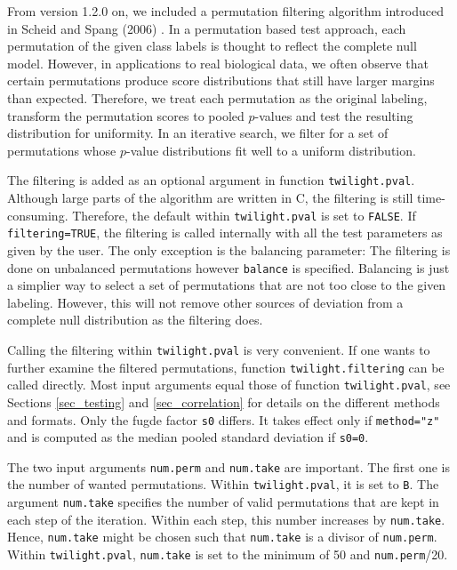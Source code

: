 \documentclass[11pt,a4paper,fleqn]{report}
\newcommand{\Rfunction}[1]{{\texttt{#1}}}
\newcommand{\Rfunarg}[1]{{\texttt{#1}}}
\begin{document}
From version 1.2.0 on, we included a permutation filtering algorithm introduced in Scheid and Spang (2006) \cite{scheid06}. In a permutation based test approach, each permutation of the given class labels is thought to reflect the complete null model. However, in applications to real biological data, we often observe that certain permutations produce score distributions that still have larger margins than expected. Therefore, we treat each permutation as the original labeling, transform the permutation scores to pooled $p$-values and test the resulting distribution for uniformity. In an iterative search, we filter for a set of permutations whose $p$-value distributions fit well to a uniform distribution.

The filtering is added as an optional argument in function \Rfunction{twilight.pval}. Although large parts of the algorithm are written in C, the filtering is still time-consuming. Therefore, the default within \Rfunction{twilight.pval} is set to \Rfunarg{FALSE}. If \Rfunarg{filtering=TRUE}, the filtering is called internally with all the test parameters as given by the user. The only exception is the balancing parameter: The filtering is done on unbalanced permutations however \Rfunarg{balance} is specified. Balancing is just a simplier way to select a set of permutations that are not too close to the given labeling. However, this will not remove other sources of deviation from a complete null distribution as the filtering does.

Calling the filtering within \Rfunction{twilight.pval} is very convenient. If one wants to further examine the filtered permutations, function \Rfunarg{twilight.filtering} can be called directly. Most input arguments equal those of function \Rfunarg{twilight.pval}, see Sections \ref{sec_testing} and \ref{sec_correlation} for details on the different methods and formats. Only the fugde factor \Rfunarg{s0} differs. It takes effect only if \Rfunarg{method="z"} and is computed as the median pooled standard deviation if \Rfunarg{s0=0}.

The two input arguments \Rfunarg{num.perm} and \Rfunarg{num.take} are important. The first one is the number of wanted permutations. Within \Rfunction{twilight.pval}, it is set to \Rfunarg{B}. The argument \Rfunarg{num.take} specifies the number of valid permutations that are kept in each step of the iteration. Within each step, this number increases by \Rfunarg{num.take}. Hence, \Rfunarg{num.take} might be chosen such that \Rfunarg{num.take} is a divisor of \Rfunarg{num.perm}. Within \Rfunction{twilight.pval}, \Rfunarg{num.take} is set to the minimum of 50 and \Rfunarg{num.perm}/20.       
\end{document}
